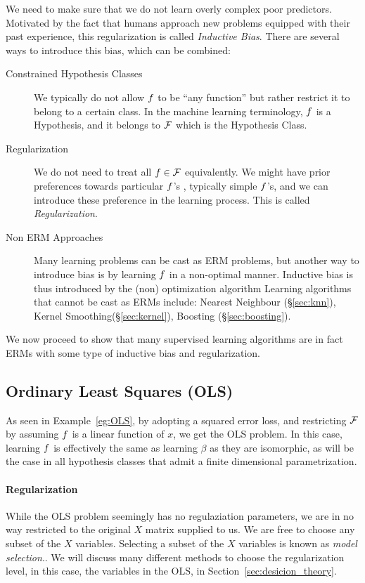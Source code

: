 We need to make sure that we do not learn overly complex poor predictors. 
Motivated by the fact that humans approach new problems equipped with their past experience, this regularization is called \emph{Inductive Bias}. 
There are several ways to introduce this bias, which can be combined:
\begin{description}
\item[Constrained Hypothesis Classes]
We typically do not allow $f$ to be ``any function'' but rather restrict it to belong to a certain class. In the machine learning terminology, $f$ is a Hypothesis, and it belongs to $\mathcal{F}$ which is the Hypothesis Class.
\item[Regularization] We do not need to treat all $f \in \mathcal{F}$ equivalently. We might have prior preferences towards particular $f$'s , typically simple $f$'s, and we can introduce these preference in the learning process. This is called \emph{Regularization}.
\item[Non ERM Approaches] Many learning problems can be cast as ERM problems, but another way to introduce bias is by learning $f$ in a non-optimal manner. Inductive bias is thus introduced by the (non) optimization algorithm 
Learning algorithms that cannot be cast as ERMs include: Nearest Neighbour (\S\ref{sec:knn}), Kernel Smoothing(\S\ref{sec:kernel}), Boosting (\S\ref{sec:boosting}).
\end{description}



We now proceed to show that many supervised learning algorithms are in fact ERMs with some type of inductive bias and regularization.

\subsection{Ordinary Least Squares (OLS)}
\label{sec:ols}
As seen in Example~\ref{eg:OLS}, by adopting a squared error loss, and restricting $\mathcal{F}$ by assuming $f$ is a linear function of $x$, we get the OLS problem.
In this case, learning $f$ is effectively the same as learning $\beta$ as they are isomorphic, as will be the case in all hypothesis classes that admit a finite dimensional parametrization.

\paragraph{Regularization}
While the OLS problem seemingly has no regulaziation parameters, we are in no way restricted to the original $X$ matrix supplied to us. 
We are free to choose any subset of the $X$ variables. Selecting a subset of the $X$ variables is known as \emph{model selection}..
We will discuss many different methods to choose the regularization level, in this case, the variables in the OLS, in Section~\ref{sec:desicion_theory}.

